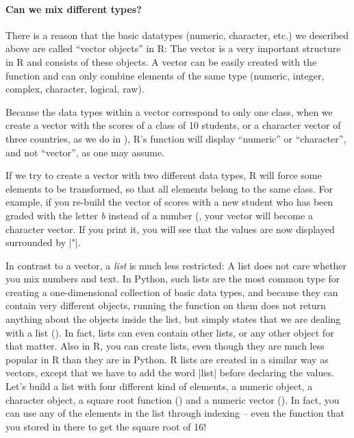 \paragraph{Can we mix different types?}
There is a reason that the basic datatypes (numeric, character, etc.) we described above are called
``vector objects'' in R: The vector is a very important structure in
R and consists of these objects. A vector can be easily created with the
 function and can only combine elements of the same type (numeric, integer, complex,
character, logical, raw).

Because the data types within a vector correspond to only one class,
when we create a vector with the scores of a class of 10 students, or a character vector of
three countries, as we do in ), R's  function will display
``numeric'' or ``character'', and not ``vector'', as one may assume.

If we try to
create a vector with two different data types, R will 
force some elements to be transformed, so that all elements belong to the same
class. For example, if you re-build the vector of scores with a new student who has
been graded with the letter \emph{b} instead of a number (, your vector
will become a character vector. If you print it, you will see that the
values are now displayed surrounded by |"|.




In contrast to a vector, a \emph{list} is much less restricted: A list does not care
whether you mix numbers and text. In Python, such lists are the most common type for creating
a one-dimensional collection of basic data types, and because they
can contain very different objects, running the  function on them
does not return anything about the objects inside the list, but simply states that we
are dealing with a list ().
In fact, lists can even contain other lists, or any other object for
that matter. 
Also in R, you can create lists, even though they are much less popular in R than
they are in Python. R lists are created in a similar way as vectors, except that we have to add the word |list|
before declaring the values. Let's build a list with four different
kind of elements, a numeric object, a character object, a square root
function () and a numeric vector (). In fact, you
can use any of the elements in the list through indexing -- even the
function  that you stored in there to get the square root of
16!

